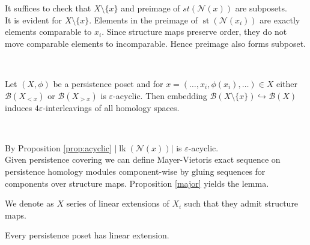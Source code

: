 \begin{pf}
  It suffices to check that $X \setminus \{x\}$ and preimage of $st(\mathcal{N}(x))$ are subposets.\\

  It is evident for $X \setminus \{x\}$. Elements in the preimage of $\operatorname{st}(\mathcal{N}(x_i))$ are exactly elements comparable to $x_i$. Since structure maps preserve order, they do not move comparable elements to incomparable. Hence preimage also forms subposet.
\end{pf}\\

\begin{lemma}
  Let $(X,\phi)$ be a persistence poset and for $x=(\ldots,x_i,\phi(x_i),\ldots) \in X$ either $\mathcal{B}(X_{< x})$ or $\mathcal{B}(X_{> x})$ is $\varepsilon$-acyclic. Then embedding $\mathcal{B}(X \setminus \{x\}) \hookrightarrow \mathcal{B}(X)$ induces $4\varepsilon$-interleavings of all homology spaces.
\end{lemma}

\begin{pf} ~ \par
  By Proposition \ref{prop:acyclic} $\left|\operatorname{lk}(\mathcal{N}(x))\right|$ is $\varepsilon$-acyclic.\\

  Given persistence covering we can define Mayer-Vietoris exact sequence on persistence homology modules component-wise by gluing sequences for components over structure maps. Proposition \ref{major} yields the lemma.
\end{pf}

\begin{definition}
  We denote as  $X$ series of linear extensions of $X_i$ such that they admit structure maps.
\end{definition}

\begin{proposition}
  Every persistence poset has linear extension.
\end{proposition}

